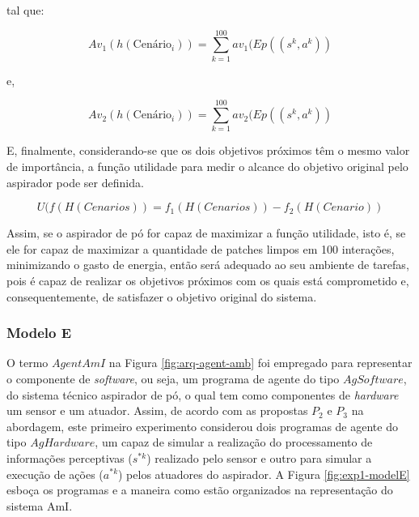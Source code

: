 tal que:

\[
Av_1(h(\textrm{Cenário}_i)) =  \sum_{k=1}^{100}av_1(Ep((s^k, a^k))
\]

e, 

\[
Av_2(h(\textrm{Cenário}_i)) = \sum_{k=1}^{100}av_2(Ep((s^k, a^k))
\]

E, finalmente, considerando-se que os dois objetivos próximos têm o mesmo valor de importância, a função utilidade para medir o alcance do objetivo original pelo aspirador pode ser definida.

\[ U(f(H(Cenarios)) = f_1(H(Cenarios)) - f_2(H(Cenario))\]

Assim, se o aspirador de pó for capaz de maximizar a função utilidade, isto é, se ele for capaz de maximizar a quantidade de patches limpos em 100 interações, minimizando o gasto de energia, então será adequado ao seu ambiente de tarefas, pois é capaz de realizar os objetivos próximos com os quais está comprometido e, consequentemente, de satisfazer o objetivo original do sistema.

\subsubsection{Modelo E}

O termo $AgentAmI$ na Figura \ref{fig:arq-agent-amb} foi empregado para representar o componente de \textit{software}, ou seja, um programa de agente do tipo $AgSoftware$, do sistema técnico aspirador de pó, o qual tem como componentes de \textit{hardware} um sensor e um atuador. Assim, de acordo com as propostas $P_2$ e $P_3$ na abordagem, este primeiro experimento considerou dois programas de agente do tipo $AgHardware$, um capaz de simular a realização do processamento de informações perceptivas ($s^{*k}$) realizado pelo sensor e outro para simular a execução de ações ($a^{*k}$) pelos atuadores do aspirador. A Figura \ref{fig:exp1-modelE} esboça os programas e a maneira como estão organizados na representação do sistema AmI.

\begin{figure}[h!]
    \centering
\end{figure}

